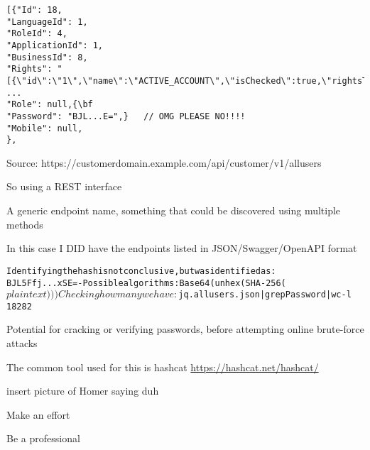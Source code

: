 \documentclass[Screen16to9,17pt]{foils}
\begin{document}


\begin{verbatim}
[{"Id": 18,
"LanguageId": 1,
"RoleId": 4,
"ApplicationId": 1,
"BusinessId": 8,
"Rights": "[{\"id\":\"1\",\"name\":\"ACTIVE_ACCOUNT\",\"isChecked\":true,\"rightsType\":1},
...
"Role": null,{\bf
"Password": "BJL...E=",}   // OMG PLEASE NO!!!!
"Mobile": null,
},
\end{verbatim}
Source: https://customerdomain.example.com/api/customer/v1/allusers

\begin{list2}
\item So using a REST interface
\item A generic endpoint name, something that could be discovered using multiple methods
\item In this case I DID have the endpoints listed in JSON/Swagger/OpenAPI format
\end{list2}



\begin{alltt}
Identifying the hash is not conclusive, but was identified as:
BJL5Ffj...xSE= - Possible algorithms: Base64(unhex(SHA-256($plaintext)))

Checking how many we have:
$ jq . allusers.json | grep Password | wc -l
18282
\end{alltt}

\begin{list2}
\item Potential for cracking or verifying passwords, before attempting online brute-force attacks
\item The common tool used for this is hashcat \url{https://hashcat.net/hashcat/}
\end{list2}





insert picture of Homer saying duh

\begin{quote}

\end{quote}

\begin{list2}
\item Make an effort
\item Be a professional
\end{list2}
\end{document}
